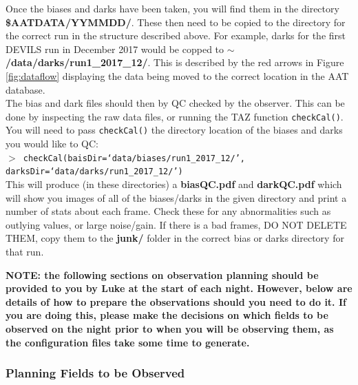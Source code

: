 \documentclass[12pt]{article}
\begin{document}
Once the biases and darks have been taken, you will find them in the directory \textbf{\$AATDATA/YYMMDD/}. These then need to be copied to the directory for the correct run in the structure described above. For example, darks  for the first DEVILS run in December 2017 would be copped to \textbf{$\sim$/data/darks/run1\_2017\_12/}. This is described by the red arrows in Figure \ref{fig:dataflow} displaying the data being moved to the correct location in the AAT database. \\   

The bias and dark files should then by QC checked by the observer. This can be done by inspecting the raw data files, or running the TAZ function \texttt{checkCal()}. You will need to pass \texttt{checkCal()} the directory location of the biases and darks you would like to QC:\\

 \texttt{$>$ checkCal(baisDir=`data/biases/run1\_2017\_12/', \\ darksDir=`data/darks/run1\_2017\_12/')} \\
 
This will produce (in these directories) a \textbf{biasQC.pdf} and \textbf{darkQC.pdf} which will show you images of all of the biases/darks in the given directory and print a number of stats about each frame. Check these for any abnormalities such as outlying values, or large noise/gain. If there is a bad frames, DO NOT DELETE THEM,  copy them to the \textbf{junk/} folder in the correct bias or darks directory for that run. 


\textbf{\textcolor{PineGreen}{NOTE: the following sections on observation planning should be provided to you by Luke at the start of each night. However, below are details of how to prepare the observations should you need to do it. If you are doing this, please make the decisions on which fields to be observed on the night prior to when you will be observing them, as the configuration files take some time to generate. }}


\subsubsection{Planning Fields to be Observed}
\end{document}
